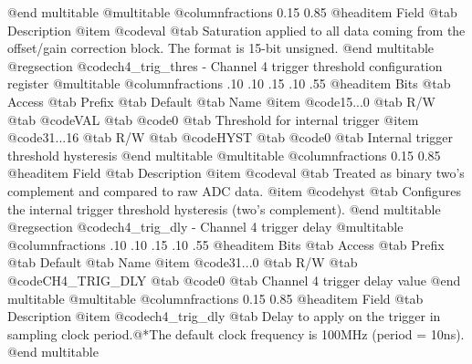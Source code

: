 @end multitable
@multitable @columnfractions 0.15 0.85
@headitem Field @tab Description
@item @code{val} @tab Saturation applied to all data coming from the offset/gain correction block. The format is 15-bit unsigned.
@end multitable
@regsection @code{ch4_trig_thres} - Channel 4 trigger threshold configuration register
@multitable @columnfractions .10 .10 .15 .10 .55
@headitem Bits @tab Access @tab Prefix @tab Default @tab Name
@item @code{15...0}
@tab R/W @tab
@code{VAL}
@tab @code{0} @tab 
Threshold for internal trigger
@item @code{31...16}
@tab R/W @tab
@code{HYST}
@tab @code{0} @tab 
Internal trigger threshold hysteresis
@end multitable
@multitable @columnfractions 0.15 0.85
@headitem Field @tab Description
@item @code{val} @tab Treated as binary two's complement and compared to raw ADC data.
@item @code{hyst} @tab Configures the internal trigger threshold hysteresis (two's complement).
@end multitable
@regsection @code{ch4_trig_dly} - Channel 4 trigger delay
@multitable @columnfractions .10 .10 .15 .10 .55
@headitem Bits @tab Access @tab Prefix @tab Default @tab Name
@item @code{31...0}
@tab R/W @tab
@code{CH4_TRIG_DLY}
@tab @code{0} @tab 
Channel 4 trigger delay value
@end multitable
@multitable @columnfractions 0.15 0.85
@headitem Field @tab Description
@item @code{ch4_trig_dly} @tab Delay to apply on the trigger in sampling clock period.@*The default clock frequency is 100MHz (period = 10ns).
@end multitable
